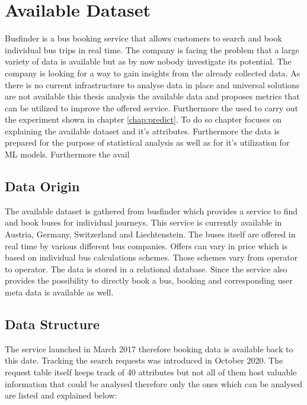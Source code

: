 %
%
% 
% 
% 

\chapter{Available Dataset}
\label{chap:available_dataset}
Busfinder is a bus booking service that allows customers to search and book individual bus trips in real time. The company is facing the problem that a large variety of data is available but as by now nobody investigate its potential. The company is looking for a way to gain insights from the already collected data. As there is no current infrastructure to analyse data in place and universal solutions are not available this thesis analysis the available data and proposes metrics that can be utilized to improve the offered service. Furthermore the used to carry out the experiment shown in chapter \ref{chap:predict}. To do so chapter focuses on explaining the available dataset and it's attributes. Furthermore the data is prepared for the purpose of statistical analysis as well as for it's utilization for ML models. Furthermore the avail

\section{Data Origin}
The available dataset is gathered from busfinder which provides a service to find and book buses for individual journeys. This service is currently available in Austria, Germany, Switzerland and Liechtenstein. The buses itself are offered in real time by various different bus companies. Offers can vary in price which is based on individual bus calculations schemes. Those schemes vary from operator to operator. The data is stored in a relational database. Since the service also provides the possibility to directly book a bus, booking and corresponding user meta data is available as well. \newline

\section{Data Structure}
The service launched in March 2017 therefore booking data is available back to this date. Tracking the search requests was introduced in October 2020. 
The request table itself keeps track of 40 attributes but not all of them host valuable information that could be analysed therefore only the ones which can be analysed are listed and explained below:

